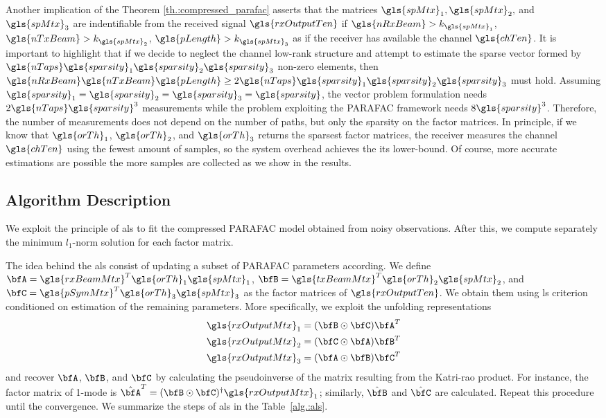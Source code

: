\documentclass[conference]{IEEEtran}
\begin{document}
Another implication of the Theorem \ref{th.:compressed_parafac} asserts that the matrices
$\gls{spMtx}_1, \gls{spMtx}_2,$ and $\gls{spMtx}_3$ are indentifiable from the
received signal $\gls{rxOutputTen}$ if $\gls{nRxBeam}>k_{\gls{spMtx}_1}$,
$\gls{nTxBeam}>k_{\gls{spMtx}_2}$, $\gls{pLength}>k_{\gls{spMtx}_3}$ as if the
receiver has available the channel $\gls{chTen}$. It is important to highlight
that if we decide to neglect the channel low-rank structure and attempt to
estimate the sparse vector formed by $\gls{nTaps} \gls{sparsity}_1
\gls{sparsity}_2 \gls{sparsity}_3$ non-zero elements, then
$\gls{nRxBeam}\gls{nTxBeam}\gls{pLength} \geq 2 \gls{nTaps}\gls{sparsity}_1\gls{sparsity}_2\gls{sparsity}_3$
must hold. Assuming
$\gls{sparsity}_1=\gls{sparsity}_2=\gls{sparsity}_3=\gls{sparsity}$, the vector
problem formulation needs $2\gls{nTaps}\gls{sparsity}^3$ measurements while the
problem exploiting the \gls{PARAFAC} framework needs $8\gls{sparsity}^3$.
Therefore, the number of measurements does not depend on the number of paths,
but only the sparsity on the factor matrices. In principle, if we know that
$\gls{orTh}_1$, $\gls{orTh}_2$, and $\gls{orTh}_3$ returns the sparsest
factor matrices, the receiver  measures the channel  $\gls{chTen}$ using the fewest
amount of samples, so the system overhead achieves the its lower-bound. Of
course, more accurate estimations are possible the more samples are collected as
we show in the results.






\subsection{Algorithm Description}

We exploit the principle of \gls{als} to fit the compressed \gls{PARAFAC} model
obtained from noisy observations. After this, we compute separately the minimum $l_1$-norm
solution for each factor matrix.

The idea behind the \gls{als} consist of updating a subset of \gls{PARAFAC} parameters
according. We define $\bfA =
\gls{rxBeamMtx}^T\gls{orTh}_1\gls{spMtx}_1$, $\bfB =
\gls{txBeamMtx}^T\gls{orTh}_2\gls{spMtx}_2$, and $\bfC =
\gls{pSymMtx}^T\gls{orTh}_3\gls{spMtx}_3$   as the factor matrices of
$\gls{rxOutputTen}$. We obtain them using \gls{ls} criterion conditioned on estimation of the remaining
parameters. More specifically, we exploit the unfolding representations
\begin{align}
 \gls{rxOutputMtx}_1 = (\bfB \odot \bfC)\bfA^T \\
 \gls{rxOutputMtx}_2 = (\bfC \odot \bfA)\bfB^T \\
 \gls{rxOutputMtx}_3 = (\bfA \odot \bfB)\bfC^T
\end{align}
and recover $\bfA$, $\bfB$, and $\bfC$ by calculating the pseudoinverse of the
matrix resulting from the Katri-rao product. For instance, the factor matrix of
1-mode is $\hat{\bfA}^T = (\bfB \odot \bfC)^{\dagger}\gls{rxOutputMtx}_1 $;
similarly, $\hat{\bfB}$ and $\hat{\bfC}$ are calculated. Repeat this procedure
until the convergence. We summarize the steps of \gls{als} in the Table~\ref{alg.:als}. 
\end{document}

